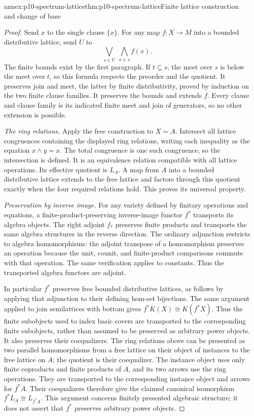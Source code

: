 \begin{annexitem}{annex:p10-spectrum-lattice}{thm:p10-spectrum-lattice}{Finite lattice construction and change of base}
\begin{proof}
Send \(x\) to the single clause \(\{x\}\).
For any map \(f:X\to M\) into a bounded distributive lattice,
send \(U\) to
\[
 \bigvee_{s\in U}\ \bigwedge_{x\in s}f(x).
\]
The finite bounds exist by the first paragraph.
If \(t\subseteq s\), the meet over \(s\) is below the meet over
\(t\), so this formula respects the preorder and the quotient.
It preserves join and meet, the latter by finite distributivity,
proved by induction on the two finite clause families.
It preserves the bounds and extends \(f\).
Every clause and clause family is its indicated finite meet and join
of generators, so no other extension is possible.

\emph{The ring relations.}
Apply the free construction to \(X=A\).
Intersect all lattice congruences containing the displayed ring
relations, writing each inequality as the equation
\(x\wedge y=x\).
The total congruence is one such congruence, so the intersection
is defined. It is an equivalence relation compatible with all
lattice operations. Its effective quotient is \(L_A\).
A map from \(A\) into a bounded distributive lattice extends to
the free lattice and factors through this quotient exactly when
the four required relations hold. This proves its universal property.

\emph{Preservation by inverse image.}
For any variety defined by finitary operations and equations,
a finite-product-preserving inverse-image functor \(f^*\)
transports its algebra objects. The right adjoint \(f_*\)
preserves finite products and transports the same algebra
structures in the reverse direction.
The ordinary adjunction restricts to algebra homomorphisms:
the adjoint transpose of a homomorphism preserves an operation
because the unit, counit, and finite-product comparisons commute
with that operation. The same verification applies to constants.
Thus the transported algebra functors are adjoint.

In particular \(f^*\) preserves free bounded distributive lattices,
as follows by applying that adjunction to their defining hom-set
bijections.
The same argument applied to join semilattices with bottom gives
\(f^*K(X)\cong K(f^*X)\). Thus the finite subobjects used to index
basic covers are transported to the corresponding finite subobjects,
rather than assumed to be preserved as arbitrary power objects. It also preserves their coequalizers.
The ring relations above can be presented as two parallel
homomorphisms from a free lattice on their object of instances
to the free lattice on \(A\); the quotient is their coequalizer.
The instance object uses only finite coproducts and finite
products of \(A\), and its two arrows use the ring operations.
They are transported to the corresponding instance object and
arrows for \(f^*A\).
Their coequalizers therefore give the claimed canonical isomorphism
\(f^*L_A\cong L_{f^*A}\).
This argument concerns finitely presented algebraic structure;
it does not assert that \(f^*\) preserves arbitrary power objects.


\end{proof}
\end{annexitem}
